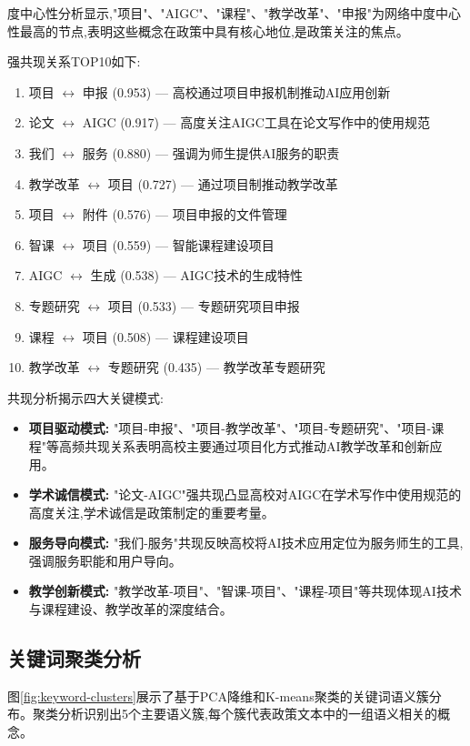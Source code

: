 \documentclass[cn,11pt,chinese]{article}
\begin{document}
度中心性分析显示,"项目"、"AIGC"、"课程"、"教学改革"、"申报"为网络中度中心性最高的节点,表明这些概念在政策中具有核心地位,是政策关注的焦点。

强共现关系TOP10如下:
\begin{enumerate}
\item 项目 $\leftrightarrow$ 申报 (0.953) — 高校通过项目申报机制推动AI应用创新
\item 论文 $\leftrightarrow$ AIGC (0.917) — 高度关注AIGC工具在论文写作中的使用规范
\item 我们 $\leftrightarrow$ 服务 (0.880) — 强调为师生提供AI服务的职责
\item 教学改革 $\leftrightarrow$ 项目 (0.727) — 通过项目制推动教学改革
\item 项目 $\leftrightarrow$ 附件 (0.576) — 项目申报的文件管理
\item 智课 $\leftrightarrow$ 项目 (0.559) — 智能课程建设项目
\item AIGC $\leftrightarrow$ 生成 (0.538) — AIGC技术的生成特性
\item 专题研究 $\leftrightarrow$ 项目 (0.533) — 专题研究项目申报
\item 课程 $\leftrightarrow$ 项目 (0.508) — 课程建设项目
\item 教学改革 $\leftrightarrow$ 专题研究 (0.435) — 教学改革专题研究
\end{enumerate}

共现分析揭示四大关键模式:
\begin{itemize}
\item \textbf{项目驱动模式:} "项目-申报"、"项目-教学改革"、"项目-专题研究"、"项目-课程"等高频共现关系表明高校主要通过项目化方式推动AI教学改革和创新应用。
\item \textbf{学术诚信模式:} "论文-AIGC"强共现凸显高校对AIGC在学术写作中使用规范的高度关注,学术诚信是政策制定的重要考量。
\item \textbf{服务导向模式:} "我们-服务"共现反映高校将AI技术应用定位为服务师生的工具,强调服务职能和用户导向。
\item \textbf{教学创新模式:} "教学改革-项目"、"智课-项目"、"课程-项目"等共现体现AI技术与课程建设、教学改革的深度结合。
\end{itemize}

\subsection{关键词聚类分析}

图\ref{fig:keyword-clusters}展示了基于PCA降维和K-means聚类的关键词语义簇分布。聚类分析识别出5个主要语义簇,每个簇代表政策文本中的一组语义相关的概念。
\end{document}
